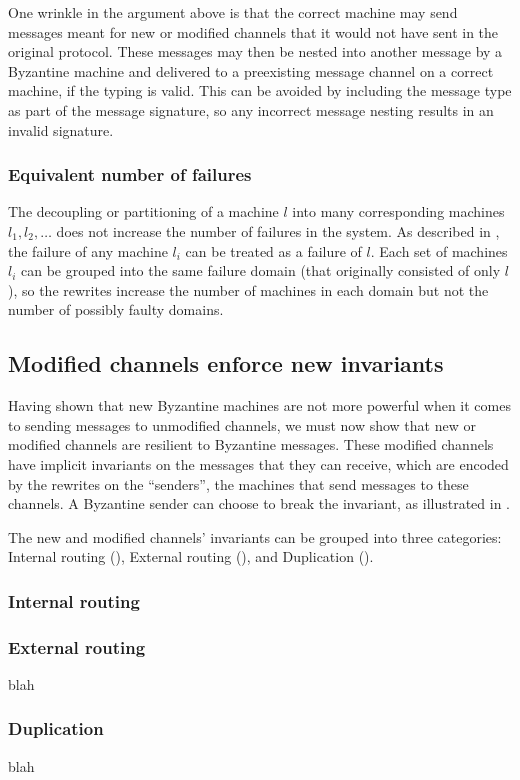 One wrinkle in the argument above is that the correct machine may send messages meant for new or modified channels that it would not have sent in the original protocol.
These messages may then be nested into another message by a Byzantine machine and delivered to a preexisting message channel on a correct machine, if the typing is valid.
This can be avoided by including the message type as part of the message signature, so any incorrect message nesting results in an invalid signature.


\subsubsection{Equivalent number of failures}
\label{sec:equivalent-number-of-failures}
The decoupling or partitioning of a machine $l$ into many corresponding machines $l_1, l_2, \ldots$ does not increase the number of failures in the system.
As described in \sigmodpaper{}, the failure of any machine $l_i$ can be treated as a failure of $l$.
Each set of machines $l_i$ can be grouped into the same failure domain (that originally consisted of only $l$), so the rewrites increase the number of machines in each domain but not the number of possibly faulty domains.



\subsection{Modified channels enforce new invariants}
\label{sec:byzantine-new-channels}
Having shown that new Byzantine machines are not more powerful when it comes to sending messages to unmodified channels, we must now show that new or modified channels are resilient to Byzantine messages.
These modified channels have implicit invariants on the messages that they can receive, which are encoded by the rewrites on the ``senders'', the machines that send messages to these channels.
A Byzantine sender can choose to break the invariant, as illustrated in . 

The new and modified channels' invariants can be grouped into three categories:
Internal routing (),
External routing (), and
Duplication ().


\subsubsection{Internal routing}
\label{sec:internal-routing}



\subsubsection{External routing}
\label{sec:external-routing}
blah

\subsubsection{Duplication}
\label{sec:duplication}
blah